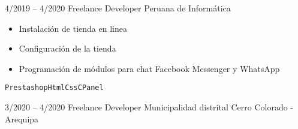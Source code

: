 
\begin{entrylist}
	\entry
		{4/2019 -- 4/2020}
		{Freelance Developer}
		{Peruana de Informática}
		{
		    \vspace{-5mm}
    	    \begin{itemize}
    	        \setlength\itemsep{0pt}
    	        \setlength\parskip{0pt}
    	        \item Instalación de tienda en linea
    	        \item Configuración de la tienda
    	        \item Programación de módulos para chat Facebook Messenger y WhatsApp
    	    \end{itemize}
		    \texttt{Prestashop}\slashsep\texttt{Html}\slashsep\texttt{Css}\slashsep\texttt{CPanel}
        }
	\entry
		{3/2020 -- 4/2020}
		{Freelance Developer}
		{Municipalidad distrital Cerro Colorado - Arequipa}
		{
		    \vspace{-5mm}
    	    \begin{itemize}
    	        \setlength\itemsep{0pt}

\end{itemize}}
\end{entrylist}
